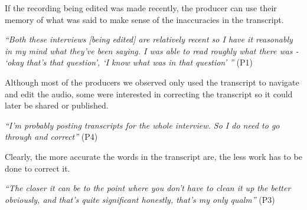 If the recording being edited was made recently, the producer can use their memory of what was said to make sense of
the inaccuracies in the transcript.

\textit{``Both these interviews [being edited] are relatively recent so I have it reasonably in my mind what they've
  been saying. I was able to read roughly what there was - `okay that's that question', `I know what was in that
  question' ''} (P1)

Although most of the producers we observed only used the transcript to navigate and edit the audio, some were
interested in correcting the transcript so it could later be shared or published.

\textit{``I'm probably posting transcripts for the whole interview. So I do need to go through and correct''} (P4)

Clearly, the more accurate the words in the transcript are, the less work has to be done to correct it.

\textit{``The closer it can be to the point where you don't have to clean it up the better obviously, and that's quite
  significant honestly, that's my only qualm''} (P3)









